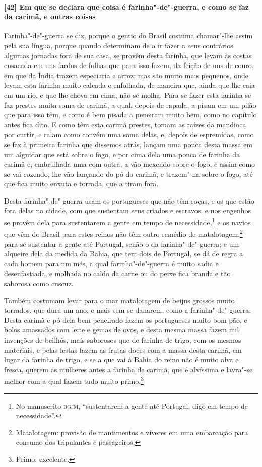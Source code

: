 \paragraph{[42] Em que se declara que coisa é farinha"-de"-guerra, e como se faz da carimã, e outras coisas}\quad
Farinha"-de"-guerra se diz, porque o gentio do Brasil costuma chamar"-lhe assim pela sua
língua, porque quando determinam de a ir fazer a seus contrários algumas jornadas fora de
sua casa, se provêm desta farinha, que levam às costas ensacada em uns fardos de folhas
que para isso fazem, da feição de uns de couro, em que da Índia trazem especiaria e arroz;
mas são muito mais pequenos, onde levam esta farinha muito calcada e enfolhada, de maneira
que, ainda que lhe caia em um rio, e que lhe chova em cima, não se molha. Para se fazer
esta farinha se faz prestes muita soma de carimã, a qual, depois de rapada, a pisam em um
pilão que para isso têm, e como é bem pisada a peneiram muito bem, como no capítulo antes
fica dito. E como têm esta carimã prestes, tomam as raízes da mandioca por curtir, e ralam
como convém uma soma delas, e, depois de espremidas, como se faz à primeira farinha que
dissemos atrás, lançam uma pouca desta massa em um alguidar que está sobre o fogo, e por
cima dela uma pouca de farinha da carimã e, embrulhada uma com outra, a vão mexendo sobre
o fogo, e assim como se vai cozendo, lhe vão lançando do pó da carimã, e trazem"-na sobre o
fogo, até que fica muito enxuta e torrada, que a tiram fora.

Desta farinha"-de"-guerra usam os portugueses que não têm roças, e os que estão fora delas
na cidade, com que sustentam seus criados e escravos, e nos engenhos se provêm dela para
sustentarem a gente em tempo de necessidade,\footnote{ No manuscrito \textsc{bgjm},
``sustentarem a gente até Portugal, digo em tempo de necessidade''.} e os navios que vêm
do Brasil para estes reinos não têm outro remédio de matalotagem,\footnote{ Matalotagem:
provisão de mantimentos e víveres em uma embarcação para consumo dos tripulantes e
passageiros.} para se sustentar a gente até Portugal, senão o da farinha"-de"-guerra; e um
alqueire dela da medida da Bahia, que tem dois de Portugal, se dá de regra a cada homem
para um mês, a qual farinha"-de"-guerra é muito sadia e desenfastiada, e molhada no caldo da
carne ou do peixe fica branda e tão saborosa como cuscuz.

Também costumam levar para o mar matalotagem de beijus grossos muito torrados, que dura um
ano, e mais sem se danarem, como a farinha"-de"-guerra. Desta carimã e pó dela bem peneirado
fazem os portugueses muito bom pão, e bolos amassados com leite e gemas de ovos, e desta
mesma massa fazem mil invenções de beilhós, mais saborosos que de farinha de trigo, com os
mesmos materiais, e pelas festas fazem as frutas doces com a
massa desta carimã, em lugar da farinha de trigo, e se a que vai à Bahia do reino não é
muito alva e fresca, querem as mulheres antes a farinha de carimã, que é alvíssima e
lavra"-se melhor com a qual fazem tudo muito primo.\footnote{ Primo: excelente.}

